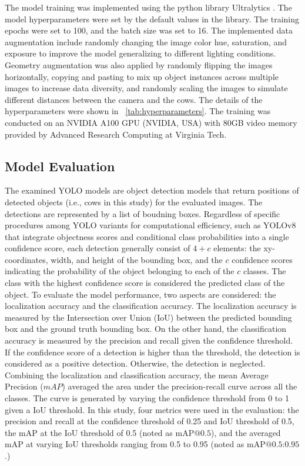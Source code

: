 The model training was implemented using the python library Ultralytics \citep{}. The model hyperparameters were set by the default values in the library. The training epochs were set to 100, and the batch size was set to 16. The implemented data augmentation include randomly changing the image color hue, saturation, and exposure to improve the model generalizing to different lighting conditions. Geometry augmentation was also applied by randomly flipping the images horizontally, copying and pasting to mix up object instances across multiple images to increase data diversity, and randomly scaling the images to simulate different distances between the camera and the cows. The details of the hyperparameters were shown in ~\ref{tab:hyperparameters}. The training was conducted on an NVIDIA A100 GPU (NVIDIA, USA) with 80GB video memory provided by Advanced Research Computing at Virginia Tech.


\subsection*{Model Evaluation}

The examined YOLO models are object detection models that return positions of detected objects (i.e., cows in this study) for the evaluated images. The detections are represented by a list of boudning boxes. Regardless of specific procedures among YOLO variants for computational efficiency, such as YOLOv8 that integrate objectness scores and conditional class probabilities into a single confidence score, each detection generally consist of $4+c$ elements: the xy-coordinates, width, and height of the bounding box, and the $c$ confidence scores indicating the probability of the object belonging to each of the $c$ classes. The class with the highest confidence score is considered the predicted class of the object. To evaluate the model performance, two aspects are considered: the localization accuracy and the classification accuracy. The localization accuracy is measured by the Intersection over Union (IoU) between the predicted bounding box and the ground truth bounding box. On the other hand, the classification accuracy is measured by the precision and recall given the confidence threshold. If the confidence score of a detection is higher than the threshold, the detection is considered as a positive detection. Otherwise, the detection is neglected. Combining the localization and classification accuracy, the mean Average Precision ($mAP$) averaged the area under the precision-recall curve across all the classes. The curve is generated by varying the confidence threshold from 0 to 1 given a IoU threshold. In this study, four metrics were used in the evaluation: the precision and recall at the confidence threshold of 0.25 and IoU threshold of 0.5, the mAP at the IoU threshold of 0.5 (noted as $\text{mAP@{0.5}}$), and the averaged mAP at varying IoU thresholds ranging from 0.5 to 0.95 (noted as $\text{mAP@{0.5:0.95}}$.)


